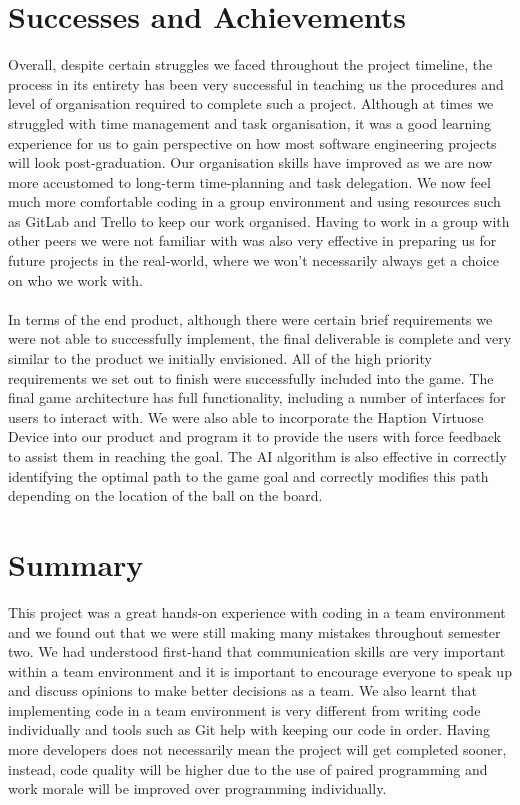 \documentclass[a4paper]{article}
\begin{document}
\section{Successes and Achievements}

Overall, despite certain struggles we faced throughout the project timeline, the process in its entirety has been very successful in teaching us the procedures and level of organisation required to complete such a project. Although at times we struggled with time management and task organisation, it was a good learning experience for us to gain perspective on how most software engineering projects will look post-graduation. Our organisation skills have improved as we are now more accustomed to long-term time-planning and task delegation.  We now feel much more comfortable coding in a group environment and using resources such as GitLab and Trello to keep our work organised. Having to work in a group with other peers we were not familiar with was also very effective in preparing us for future projects in the real-world, where we won't necessarily always get a choice on who we work with.
\\ \\
In terms of the end product, although there were certain brief requirements we were not able to successfully implement, the final deliverable is complete and very similar to the product we initially envisioned. All of the high priority requirements we set out to finish were successfully included into the game. The final game architecture has full functionality, including a number of interfaces for users to interact with. We were also able to incorporate the Haption Virtuose Device into our product and program it to provide the users with force feedback to assist them in reaching the goal. The AI algorithm is also effective in correctly identifying the optimal path to the game goal and correctly modifies this path depending on the location of the ball on the board.

\section{Summary}
This project was a great hands-on experience with coding in a team environment and we found out that we were still making many mistakes throughout semester two. We had understood first-hand that communication skills are very important within a team environment and it is important to encourage everyone to speak up and discuss opinions to make better decisions as a team. We also learnt that implementing code in a team environment is very different from writing code individually and tools such as Git help with keeping our code in order. Having more developers does not necessarily mean the project will get completed sooner, instead, code quality will be higher due to the use of paired programming and work morale will be improved over programming individually. 
\end{document}
